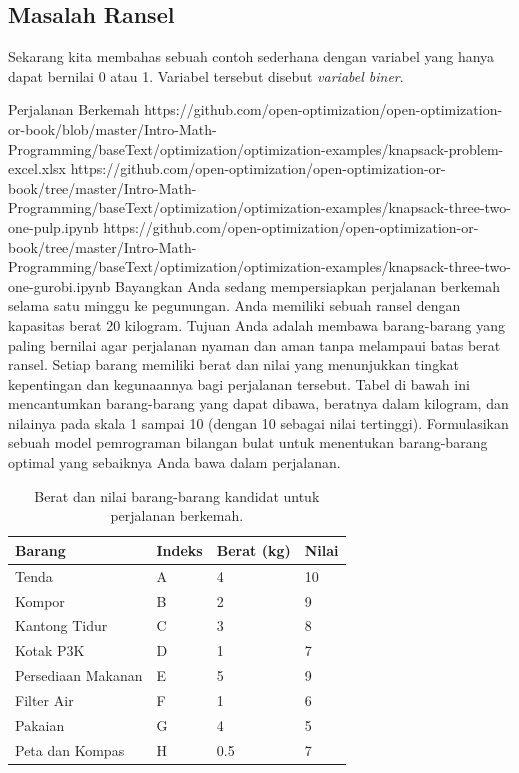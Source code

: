 \newpage
\subsection{Masalah Ransel}
Sekarang kita membahas sebuah contoh sederhana dengan variabel yang hanya dapat bernilai 0 atau 1. Variabel tersebut disebut \emph{variabel biner}.
\begin{examplewithallcode}{Perjalanan Berkemah}
{https://github.com/open-optimization/open-optimization-or-book/blob/master/Intro-Math-Programming/baseText/optimization/optimization-examples/knapsack-problem-excel.xlsx}
{https://github.com/open-optimization/open-optimization-or-book/tree/master/Intro-Math-Programming/baseText/optimization/optimization-examples/knapsack-three-two-one-pulp.ipynb}
{https://github.com/open-optimization/open-optimization-or-book/tree/master/Intro-Math-Programming/baseText/optimization/optimization-examples/knapsack-three-two-one-gurobi.ipynb}
Bayangkan Anda sedang mempersiapkan perjalanan berkemah selama satu minggu ke pegunungan. Anda memiliki sebuah ransel dengan kapasitas berat 20 kilogram. Tujuan Anda adalah membawa barang-barang yang paling bernilai agar perjalanan nyaman dan aman tanpa melampaui batas berat ransel. Setiap barang memiliki berat dan nilai yang menunjukkan tingkat kepentingan dan kegunaannya bagi perjalanan tersebut. Tabel di bawah ini mencantumkan barang-barang yang dapat dibawa, beratnya dalam kilogram, dan nilainya pada skala 1 sampai 10 (dengan 10 sebagai nilai tertinggi).
\newline
Formulasikan sebuah model pemrograman bilangan bulat untuk menentukan barang-barang optimal yang sebaiknya Anda bawa dalam perjalanan. 
\end{examplewithallcode}

\begin{table}[h!] \begin{center} \begin{tabular} {|l|l|l|l|} 
\hline Barang & Indeks & Berat (kg) & Nilai  \\ \hline
\hline Tenda & A & 4 & 10  \\
\hline Kompor & B & 2 & 9  \\
\hline Kantong Tidur & C & 3 & 8  \\
\hline Kotak P3K & D & 1 & 7  \\
\hline Persediaan Makanan & E & 5 & 9  \\
\hline Filter Air & F & 1 & 6  \\
\hline Pakaian & G & 4 & 5  \\
\hline Peta dan Kompas & H & 0.5 & 7  \\
\hline \end{tabular} \end{center} \caption{Berat dan nilai barang-barang kandidat untuk perjalanan berkemah.}\label{tab:modeling-linear-programming-tab04}%
\end{table}

